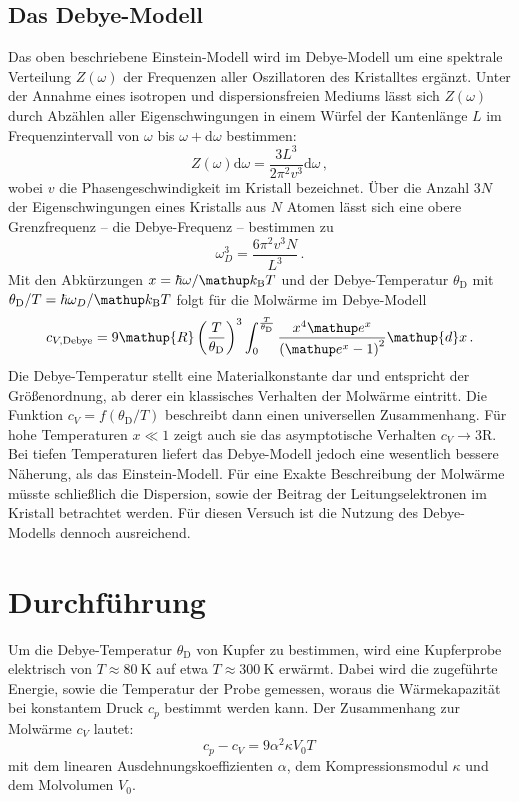\subsection{Das Debye-Modell}
\label{subsec:debye}
Das oben beschriebene Einstein-Modell wird im Debye-Modell um eine spektrale
Verteilung $Z(\omega)$ der Frequenzen aller Oszillatoren des Kristalltes
ergänzt.
Unter der Annahme eines isotropen und dispersionsfreien Mediums lässt sich
$Z(\omega)$ durch Abzählen aller Eigenschwingungen in einem Würfel
der Kantenlänge $L$ im Frequenzintervall von $\omega$ bis
$\omega+\mathup{d}\omega$ bestimmen:
\begin{equation}
    \label{eqn:z}
    Z(\omega)\mathup{d}\omega = \frac{3L^3}{2\pi^2 v^3} \mathup{d}\omega\,,
\end{equation}
wobei $v$ die Phasengeschwindigkeit im Kristall bezeichnet.
Über die Anzahl $3N$ der Eigenschwingungen eines Kristalls aus $N$ Atomen
lässt sich eine obere Grenzfrequenz -- die Debye-Frequenz -- bestimmen zu
\begin{equation}
    \label{eqn:omega_debye}
    \omega_D^3 = \frac{6\pi^2 v^3 N}{L^3}\,.
\end{equation}
Mit den Abkürzungen $x = \hbar\omega/\kb T$ und der Debye-Temperatur
$\theta_\text{D}$ mit $\theta_\text{D}/T = \hbar\omega_D/\kb T$ folgt
für die Molwärme im Debye-Modell
\begin{equation}
    \label{eqn:cv_debye}
    c_{V,\text{Debye}} =
    9\mathup{R}\left(\frac{T}{\theta_\text{D}}\right)^3
    \int_0^{\frac{T}{\theta_\text{D}}}
    \frac{x^4\e^x}{\left(\e^x-1\right)^2}\mathup{d}x\,.
\end{equation}
Die Debye-Temperatur stellt eine Materialkonstante dar und entspricht der
Größenordnung, ab derer ein klassisches Verhalten der Molwärme eintritt.
Die Funktion $c_V = f(\theta_\text{D}/T)$ beschreibt dann einen universellen
Zusammenhang. Für hohe Temperaturen $x \ll \num{1}$ zeigt auch sie das
asymptotische Verhalten $c_V\to 3\mathup{R}$.
Bei tiefen Temperaturen liefert das Debye-Modell jedoch eine wesentlich
bessere Näherung, als das Einstein-Modell.
Für eine Exakte Beschreibung der Molwärme müsste schließlich die Dispersion,
sowie der Beitrag der Leitungselektronen im Kristall betrachtet werden.
Für diesen Versuch ist die Nutzung des Debye-Modells dennoch ausreichend.

\section{Durchführung}
\label{sec:durchführung}
Um die Debye-Temperatur $\theta_\text{D}$ von Kupfer zu bestimmen, wird
eine Kupferprobe elektrisch von $T \approx \SI{80}{\kelvin}$ auf etwa
$T \approx \SI{300}{\kelvin}$ erwärmt.
Dabei wird die zugeführte Energie, sowie die Temperatur der Probe gemessen,
woraus die Wärmekapazität bei konstantem Druck $c_p$ bestimmt werden kann.
Der Zusammenhang zur Molwärme $c_V$ lautet:
\begin{equation}
    \label{eqn:cp_cv}
    c_p - c_V = 9\alpha^2\kappa V_0 T\,
\end{equation}
mit dem linearen Ausdehnungskoeffizienten $\alpha$, dem Kompressionsmodul
$\kappa$ und dem Molvolumen $V_0$.

